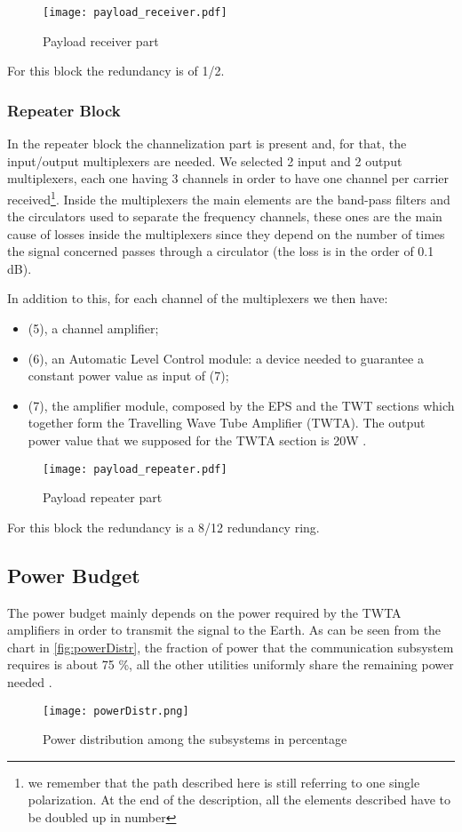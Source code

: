 \begin{figure}[h]
	\centering
	\texttt{[image: payload\_receiver.pdf]}
	\caption{Payload receiver part}
	\label{fig:receiver}
\end{figure}
For this block the redundancy is of 1/2.

\subsubsection{Repeater Block}
	In the repeater block the channelization part is present and, for that, the input/output multiplexers are needed. We selected 2 input and 2 output multiplexers, each one having 3 channels in order to have one channel per carrier received\footnote{we remember that the path described here is still referring to one single polarization. At the end of the description, all the elements described have to be doubled up in number}. Inside the multiplexers the main elements are the band-pass filters and the circulators used to separate the frequency channels, these ones are the main cause of losses inside the multiplexers since they depend on the number of times the signal concerned passes through a circulator (the loss is in the order of 0.1 dB). \cite{Maral2017}

In addition to this, for each channel of the multiplexers we then have:
	\begin{itemize}
	\item (5), a channel amplifier;
	\item (6), an Automatic Level Control module: a device needed to guarantee a constant power value as input of (7);
	\item (7), the amplifier module, composed by the EPS and the TWT sections which together form the Travelling Wave Tube Amplifier (TWTA). The output power value that we supposed for the TWTA section is 20W \cite{Maral2017}.
	\end{itemize}
	\begin{figure}[h]
		\centering
		\texttt{[image: payload\_repeater.pdf]}
		\caption{Payload repeater part}
		\label{fig:repeater}
	\end{figure}
For this block the redundancy is a 8/12 redundancy ring.

\subsection{Power Budget}
The power budget mainly depends on the power required by the TWTA amplifiers in order to transmit the signal to the Earth. As can be seen from the chart in \autoref{fig:powerDistr}, the fraction of power that the communication subsystem requires is about 75 \%, all the other utilities uniformly share the remaining power needed \cite{Miguel17}.
\begin{figure}[h]
\centering
\texttt{[image: powerDistr.png]}
\caption{Power distribution among the subsystems in percentage}
\label{fig:powerDistr}
\end{figure}
